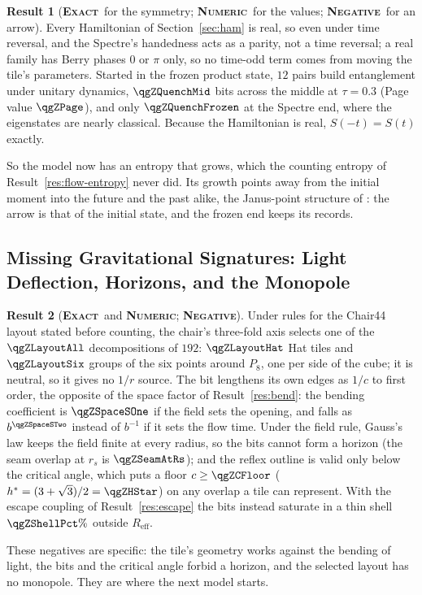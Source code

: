 \documentclass[11pt]{article}
\newcommand{\exact}{\textbf{\textsc{Exact}}}
\newcommand{\numeric}{\textbf{\textsc{Numeric}}}
\newcommand{\negres}{\textbf{\textsc{Negative}}}
\theoremstyle{definition}
\newtheorem{result}{Result}
\begin{document}
\begin{result}[\exact\ for the symmetry; \numeric\ for the values; \negres\ for an arrow]\label{res:toward-entropy}
Every Hamiltonian of Section~\ref{sec:ham} is real, so even under time reversal, and the Spectre's handedness acts as a parity, not a time reversal; a real family has Berry phases $0$ or $\pi$ only, so no time-odd term comes from moving the tile's parameters. Started in the frozen product state, $12$ pairs build entanglement under unitary dynamics, $\qgZQuenchMid$ bits across the middle at $\tau=0.3$ (Page value $\qgZPage$), and only $\qgZQuenchFrozen$ at the Spectre end, where the eigenstates are nearly classical. Because the Hamiltonian is real, $S(-t)=S(t)$ exactly.
\end{result}
So the model now has an entropy that grows, which the counting entropy of Result~\ref{res:flow-entropy} never did. Its growth points away from the initial moment into the future and the past alike, the Janus-point structure of \cite{barbourlobo2026}: the arrow is that of the initial state, and the frozen end keeps its records.

\subsection{Missing Gravitational Signatures: Light Deflection, Horizons, and the Monopole}
\label{sec:toward-gravity}
\begin{result}[\exact\ and \numeric; \negres]\label{res:toward-gravity}
Under rules for the Chair44 layout stated before counting, the chair's three-fold axis selects one of the $\qgZLayoutAll$ decompositions of $192$: $\qgZLayoutHat$ Hat tiles and $\qgZLayoutSix$ groups of the six points around $P_8$, one per side of the cube; it is neutral, so it gives no $1/r$ source. The bit lengthens its own edges as $1/c$ to first order, the opposite of the space factor of Result~\ref{res:bend}: the bending coefficient is $\qgZSpaceSOne$ if the field sets the opening, and falls as $b^{\qgZSpaceSTwo}$ instead of $b^{-1}$ if it sets the flow time. Under the field rule, Gauss's law keeps the field finite at every radius, so the bits cannot form a horizon (the seam overlap at $r_s$ is $\qgZSeamAtRs$); and the reflex outline is valid only below the critical angle, which puts a floor $c\ge\qgZCFloor$ ($h^*=(3+\sqrt3)/2=\qgZHStar$) on any overlap a tile can represent. With the escape coupling of Result~\ref{res:escape} the bits instead saturate in a thin shell $\qgZShellPct\%$ outside $R_{\mathrm{eff}}$.
\end{result}
These negatives are specific: the tile's geometry works against the bending of light, the bits and the critical angle forbid a horizon, and the selected layout has no monopole. They are where the next model starts.
\end{document}
